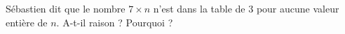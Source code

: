 
\begin{exercice}\label{exo2smath-0099}

    Sébastien dit que le nombre \( 7\times n\) n'est dans la table de \( 3\) pour aucune valeur entière de \( n\). A-t-il raison ? Pourquoi ?

\end{exercice}
